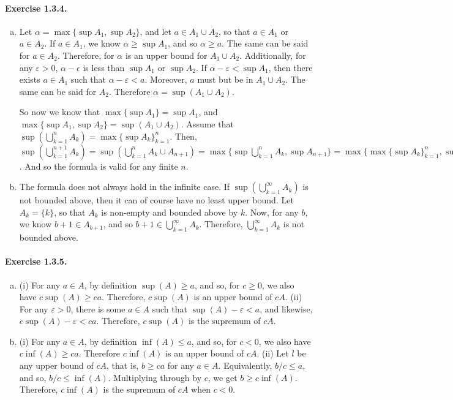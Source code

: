 \documentclass{article}
\begin{document}
\paragraph{Exercise 1.3.4.}
\begin{enumerate}[(a)]
    \item Let $\alpha = \max\{\sup A_1, \sup A_2\}$, and let $a \in A_1 \cup A_2$, so that $a \in A_1$ or $a \in A_2$. If $a \in A_1$, we know $\alpha \geq \sup A_1$, and so $\alpha \geq a$. The same can be said for $a \in A_2$. Therefore, for $\alpha$ is an upper bound for $A_1 \cup A_2$. Additionally, for any $\varepsilon > 0$, $\alpha - \epsilon$ is less than $\sup A_1$ or $\sup A_2$. If $\alpha - \varepsilon < \sup A_1$, then there exists $a \in A_1$ such that $\alpha - \varepsilon < a$. Moreover, $a$ must but be in $A_1 \cup A_2$. The same can be said for $A_2$. Therefore $\alpha = \sup(A_1 \cup A_2)$.

    So now we know that $\max\{\sup A_1\} = \sup A_1$, and $\max\{\sup A_1, \sup A_2\} = \sup(A_1 \cup A_2)$. Assume that $\sup(\bigcup_{k=1}^n A_k) = \max\{\sup A_k\}_{k=1}^n$. Then, $\sup(\bigcup_{k=1}^{n+1} A_k) = \sup(\bigcup_{k=1}^{n} A_k \cup A_{n+1}) = \max\{\sup \bigcup_{k=1}^{n} A_k, \sup A_{n+1}\} = \max\{\max\{\sup A_k\}_{k=1}^n, \sup A_{n+1}\} = \max\{\sup A_k\}_{k=1}^{n+1}$. And so the formula is valid for any finite $n$.

    \item The formula does not always hold in the infinite case. If $\sup(\bigcup_{k=1}^\infty A_k)$ is not bounded above, then it can of course have no least upper bound. Let $A_k = \{ k \}$, so that $A_k$ is non-empty and bounded above by $k$. Now, for any $b$, we know $b+1 \in A_{b+1}$, and so $b+1 \in \bigcup_{k=1}^\infty A_k$. Therefore, $\bigcup_{k=1}^\infty A_k$ is not bounded above.
\end{enumerate}

\paragraph{Exercise 1.3.5.}
\begin{enumerate}[(a)]
    \item (i) For any $a \in A$, by definition $\sup(A) \geq a$, and so, for $c \geq 0$, we also have    $c\sup(A) \geq ca$. Therefore, $c\sup(A)$ is an upper bound of $cA$. (ii) For any $\varepsilon > 0$, there is some $a \in A$ such that $\sup(A)-\varepsilon < a$, and likewise, $c\sup(A) - \varepsilon < ca$. Therefore, $c\sup(A)$ is the supremum of $cA$.
    \item (i) For any $a\in A$, by definition $\inf(A) \leq a$, and so, for $c < 0$, we also have $c\inf(A) \geq ca$. Therefore $c\inf(A)$ is an upper bound of $cA$. (ii) Let $l$ be any upper bound of $cA$, that is, $b \geq ca$ for any $a \in A$. Equivalently, $b/c \leq a$, and so, $b/c \leq \inf(A)$. Multiplying through by $c$, we get $b \geq c\inf(A)$. Therefore, $c\inf(A)$ is the supremum of $cA$ when $c<0$.
\end{enumerate}
\end{document}
